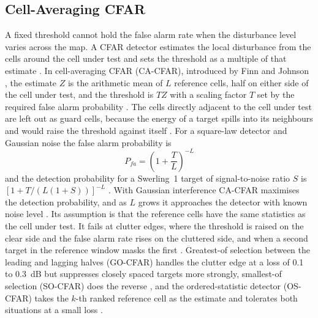 \subsection{Cell-Averaging CFAR}
\label{subsec:th.cfar.ca}
\todo{}
A fixed threshold cannot hold the false alarm rate when the disturbance level varies across the map. A CFAR detector estimates the local disturbance from the cells around the cell under test and sets the threshold as a multiple of that estimate \citep{rohling1983}. In cell-averaging CFAR (CA-CFAR), introduced by Finn and Johnson \citep{finn1968} , the estimate $Z$ is the arithmetic mean of $L$ reference cells, half on either side of the cell under test, and the threshold is $TZ$ with a scaling factor $T$ set by the required false alarm probability \citep{rohling1983,weiss1982}. The cells directly adjacent to the cell under test are left out as guard cells, because the energy of a target spills into its neighbours and would raise the threshold against itself \citep{rohling1983}. For a square-law detector and Gaussian noise the false alarm probability is \citep{hansen1980}
\begin{equation}
    P_{fa} = \left( 1 + \frac{T}{L} \right)^{-L}
    \label{eq:cacfar-pfa}
\end{equation}
and the detection probability for a Swerling~1 target of signal-to-noise ratio $S$ is $[1 + T / (L (1 + S))]^{-L}$ \citep{hansen1980}. With Gaussian interference CA-CFAR maximises the detection probability, and as $L$ grows it approaches the detector with known noise level \citep{weiss1982}. Its assumption is that the reference cells have the same statistics as the cell under test. It fails at clutter edges, where the threshold is raised on the clear side and the false alarm rate rises on the cluttered side, and when a second target in the reference window masks the first \citep{weiss1982,rohling1983}. Greatest-of selection between the leading and lagging halves (GO-CFAR) handles the clutter edge at a loss of 0.1 to 0.3~dB \citep{hansen1980} but suppresses closely spaced targets more strongly, smallest-of selection (SO-CFAR) does the reverse \citep{weiss1982,trunk1978}, and the ordered-statistic detector (OS-CFAR) takes the $k$-th ranked reference cell as the estimate and tolerates both situations at a small loss \citep{rohling1983}.

